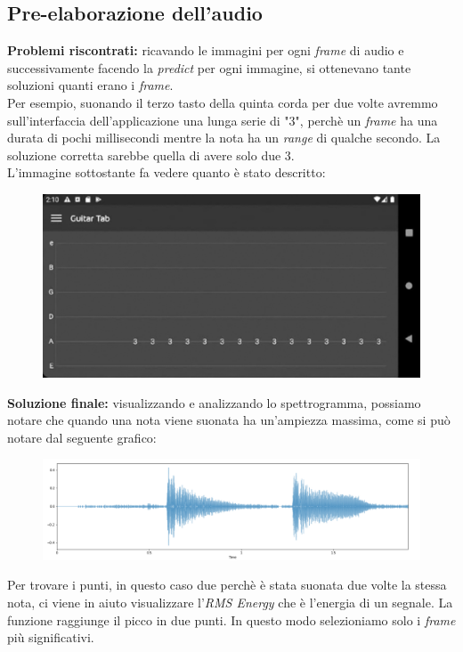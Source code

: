 \subsection{Pre-elaborazione dell'audio}
\textbf{Problemi riscontrati:} ricavando le immagini per ogni \textit{frame} di audio e successivamente facendo la \textit{predict} per ogni immagine, si ottenevano tante soluzioni quanti erano i \textit{frame}.\\ Per esempio, suonando il terzo tasto della quinta corda per due volte avremmo sull'interfaccia dell'applicazione una lunga serie di "3", perchè un \textit{frame} ha una durata di pochi millisecondi mentre la nota ha un \textit{range} di qualche secondo. La soluzione corretta sarebbe quella di avere solo due 3. \\
\newline
L'immagine sottostante fa vedere quanto è stato descritto:
\begin{figure}[H]
	\centering
	\includegraphics[scale=0.28]{./images/img25.png}
\end{figure}
\noindent \textbf{Soluzione finale:} visualizzando e analizzando lo spettrogramma, possiamo notare che quando una nota viene suonata ha un'ampiezza massima, come si può notare dal seguente grafico:
\begin{figure}[H]
	\centering
	\includegraphics[scale=0.35]{./images/img26.png}
\end{figure}
\noindent Per trovare i punti, in questo caso due perchè è stata suonata due volte la stessa nota, ci viene in aiuto visualizzare l'\textit{RMS Energy} che è l'energia di un segnale. La funzione raggiunge il picco in due punti. In questo modo selezioniamo solo i \textit{frame} più significativi.
